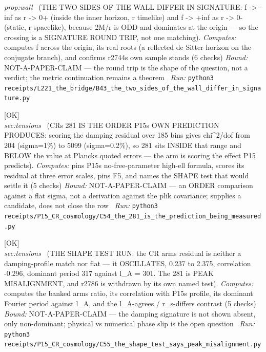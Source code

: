 \begin{description}
\textit{prop:wall} \ (THE TWO SIDES OF THE WALL DIFFER IN SIGNATURE: f -> -inf as r -> 0+ (inside the inner horizon, r timelike) and f -> +inf as r -> 0- (static, r spacelike), because 2M/r is ODD and dominates at the origin --- so the crossing is a SIGNATURE ROUND TRIP, not one matching). 
\emph{Computes:} computes f across the origin, its real roots (a reflected de Sitter horizon on the conjugate branch), and confirms r2744s own sample stands (6 checks)
 \emph{Bound:} NOT-A-PAPER-CLAIM --- the round trip is the shape of the question, not a verdict; the metric continuation remains a theorem
\ \emph{Run:} \texttt{python3 receipts/L221\_the\_bridge/B43\_the\_two\_sides\_of\_the\_wall\_differ\_in\_signature.py}
\item[\label{rcpt:C54_the_281_is_the_prediction_being_measured}\texttt{C54\_the\_281\_is\_the\_prediction\_being\_measured}]\hfill\textsf{[OK]}\\
\textit{sec:tensions} \ (CRs 281 IS THE ORDER P15s OWN PREDICTION PRODUCES: scoring the damping residual over 185 bins gives chi\textasciicircum{}2/dof from 204 (sigma=1\%) to 5099 (sigma=0.2\%), so 281 sits INSIDE that range and BELOW the value at Plancks quoted errors --- the arm is scoring the effect P15 predicts). 
\emph{Computes:} pins P15s no-free-parameter high-ell formula, scores its residual at three error scales, pins F5, and names the SHAPE test that would settle it (5 checks)
 \emph{Bound:} NOT-A-PAPER-CLAIM --- an ORDER comparison against a flat sigma, not a derivation against the plik covariance; supplies a candidate, does not close the row
\ \emph{Run:} \texttt{python3 receipts/P15\_CR\_cosmology/C54\_the\_281\_is\_the\_prediction\_being\_measured.py}
\item[\label{rcpt:C55_the_shape_test_says_peak_misalignment}\texttt{C55\_the\_shape\_test\_says\_peak\_misalignment}]\hfill\textsf{[OK]}\\
\textit{sec:tensions} \ (THE SHAPE TEST RUN: the CR arms residual is neither a damping-profile match nor flat --- it OSCILLATES, 0.237 to 2.375, correlation -0.296, dominant period 317 against l\_A = 301. The 281 is PEAK MISALIGNMENT, and r2786 is withdrawn by its own named test). 
\emph{Computes:} computes the banked arms ratio, its correlation with P15s profile, its dominant Fourier period against l\_A, and the l\_A-agrees / r\_s-differs contrast (5 checks)
 \emph{Bound:} NOT-A-PAPER-CLAIM --- the damping signature is not shown absent, only non-dominant; physical vs numerical phase slip is the open question
\ \emph{Run:} \texttt{python3 receipts/P15\_CR\_cosmology/C55\_the\_shape\_test\_says\_peak\_misalignment.py}

\end{description}
